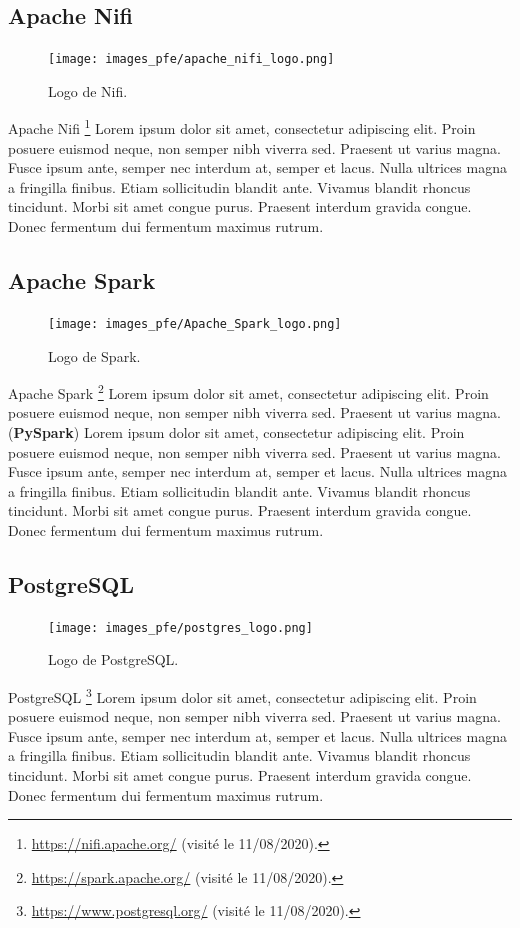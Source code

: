 \subsection*{Apache Nifi}
\begin{figure}
  \centering
  \texttt{[image: images\_pfe/apache\_nifi\_logo.png]}
  \caption{Logo de Nifi.}
\end{figure}
\FloatBarrier
Apache Nifi \footnote{\url{https://nifi.apache.org/} (visité le 11/08/2020).} Lorem ipsum dolor sit amet, consectetur adipiscing elit. Proin posuere euismod neque, non semper nibh viverra sed. Praesent ut varius magna. Fusce ipsum ante, semper nec interdum at, semper et lacus. Nulla ultrices magna a fringilla finibus. Etiam sollicitudin blandit ante. Vivamus blandit rhoncus tincidunt. Morbi sit amet congue purus. Praesent interdum gravida congue. Donec fermentum dui fermentum maximus rutrum.

\subsection*{Apache Spark}
\begin{figure}
  \centering
  \texttt{[image: images\_pfe/Apache\_Spark\_logo.png]}
  \caption{Logo de Spark.}
\end{figure}
\FloatBarrier
Apache Spark \footnote{\url{https://spark.apache.org/} (visité le 11/08/2020).} Lorem ipsum dolor sit amet, consectetur adipiscing elit. Proin posuere euismod neque, non semper nibh viverra sed. Praesent ut varius magna. (\textbf{PySpark}) Lorem ipsum dolor sit amet, consectetur adipiscing elit. Proin posuere euismod neque, non semper nibh viverra sed. Praesent ut varius magna. Fusce ipsum ante, semper nec interdum at, semper et lacus. Nulla ultrices magna a fringilla finibus. Etiam sollicitudin blandit ante. Vivamus blandit rhoncus tincidunt. Morbi sit amet congue purus. Praesent interdum gravida congue. Donec fermentum dui fermentum maximus rutrum.

\subsection*{PostgreSQL}
\begin{figure}
  \centering
  \texttt{[image: images\_pfe/postgres\_logo.png]}
  \caption{Logo de PostgreSQL.}
\end{figure}
\FloatBarrier
PostgreSQL \footnote{\url{https://www.postgresql.org/} (visité le 11/08/2020).} Lorem ipsum dolor sit amet, consectetur adipiscing elit. Proin posuere euismod neque, non semper nibh viverra sed. Praesent ut varius magna. Fusce ipsum ante, semper nec interdum at, semper et lacus. Nulla ultrices magna a fringilla finibus. Etiam sollicitudin blandit ante. Vivamus blandit rhoncus tincidunt. Morbi sit amet congue purus. Praesent interdum gravida congue. Donec fermentum dui fermentum maximus rutrum.

